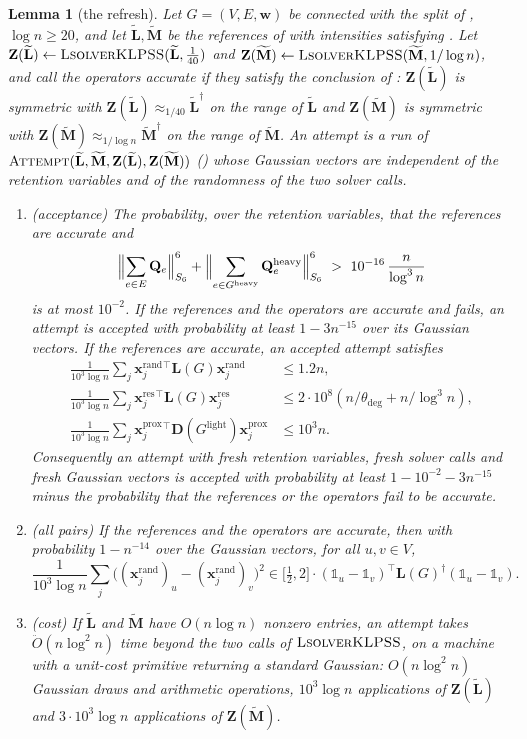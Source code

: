 \documentclass[11pt]{article}
\newtheorem{lemma}[theorem]{Lemma}
\theoremstyle{remark}
\newcommand{\DD}{\mathbf D}
\newcommand{\LL}{\mathbf L}
\newcommand{\LLtil}{{\widetilde{\LL}}}
\newcommand{\MM}{\mathbf M}
\newcommand{\MMtil}{{\widetilde{\MM}}}
\newcommand{\QQ}{\mathbf Q}
\newcommand{\ww}{\mathbf w}
\newcommand{\xx}{\mathbf x}
\newcommand{\xxproxy}{\xx^{\mathrm{prox}}}
\newcommand{\xxrand}{\xx^{\mathrm{rand}}}
\newcommand{\xxres}{\xx^{\mathrm{res}}}
\newcommand{\ZZ}{\mathbf Z}
\newcommand{\dheavy}{\theta_{\deg}}
\newcommand{\Gh}{G^{\mathrm{heavy}}}
\newcommand{\Gl}{G^{\mathrm{light}}}
\newcommand{\Odouble}{\ddot{O}}
\newcommand{\oone}{\mathds{1}}
\begin{document}
\begin{lemma}[the refresh]
\label{lem:refresh}
Let $G=(V,E,\ww)$ be connected with the split of ,
$\log n\ge20$, and let $\LLtil,\MMtil$ be the references of
 with intensities satisfying .
Let $\ZZ(\LLtil)\leftarrow\textsc{LsolverKLPSS}(\LLtil,\frac1{40})$ and
$\ZZ(\MMtil)\leftarrow\textsc{LsolverKLPSS}(\MMtil,1/\log n)$, and call the
operators \emph{accurate} if they satisfy the conclusion of :
$\ZZ(\LLtil)$ is symmetric with $\ZZ(\LLtil)\approx_{1/40}\LLtil^{\dag}$ on
the range of $\LLtil$ and $\ZZ(\MMtil)$ is symmetric with
$\ZZ(\MMtil)\approx_{1/\log n}\MMtil^{\dag}$ on the range of $\MMtil$.
An \emph{attempt} is a run of $\textsc{Attempt}(\LLtil,\MMtil,\ZZ(\LLtil),\ZZ(\MMtil))$
() whose Gaussian vectors are independent of the
retention variables and of the randomness of the two solver calls.
\begin{enumerate}[label=(\alph*),leftmargin=*]
\item (acceptance)
The probability, over the retention variables, that the references are
accurate and
\begin{equation}\label{eq:goodrefs}
\Bigl\|\sum_{e\in E}\QQ_e\Bigr\|_{S_6}^{6}
+\Bigl\|\sum_{e\in\Gh}\QQ^{\mathrm{heavy}}_e\Bigr\|_{S_6}^{6}
\ >\ 10^{-16}\,\frac{n}{\log^{3}n}
\end{equation}
is at most $10^{-2}$.
If the references and the operators are accurate and 
fails, an attempt is accepted with probability at least $1-3n^{-15}$ over
its Gaussian vectors.
If the references are accurate, an accepted attempt satisfies
\begin{equation}\label{eq:energies}
\begin{aligned}
\frac1{10^{3}\log n}\sum_j\xxrand_j{}^{\top}\LL(G)\xxrand_j&\le1.2n,\\
\frac1{10^{3}\log n}\sum_j\xxres_j{}^{\top}\LL(G)\xxres_j&\le2\cdot10^{8}(n/\dheavy+n/\log^{3}n),\\
\frac1{10^{3}\log n}\sum_j\xxproxy_j{}^{\top}\DD(\Gl)\xxproxy_j&\le10^{3}n .
\end{aligned}
\end{equation}
Consequently an attempt with fresh retention variables, fresh solver calls
and fresh Gaussian vectors is accepted with probability at least
$1-10^{-2}-3n^{-15}$ minus the probability that the references or the
operators fail to be accurate.
\item (all pairs)
If the references and the operators are accurate, then with probability
$1-n^{-14}$ over the Gaussian vectors, for all $u,v\in V$,
\[
\frac1{10^{3}\log n}\sum_j\bigl((\xxrand_j)_u-(\xxrand_j)_v\bigr)^{2}
\in\bigl[\tfrac12,2\bigr]\cdot(\oone_u-\oone_v)^{\top}\LL(G)^{\dag}(\oone_u-\oone_v).
\]
\item (cost)
If $\LLtil$ and $\MMtil$ have $O(n\log n)$ nonzero entries, an attempt
takes $\Odouble(n\log^{2}n)$ time beyond the two calls of
$\textsc{LsolverKLPSS}$, on a machine with a unit-cost primitive returning
a standard Gaussian: $O(n\log^{2}n)$ Gaussian draws and arithmetic
operations, $10^{3}\log n$ applications of $\ZZ(\LLtil)$ and
$3\cdot10^{3}\log n$ applications of $\ZZ(\MMtil)$.
\end{enumerate}
\end{lemma}
\end{document}
